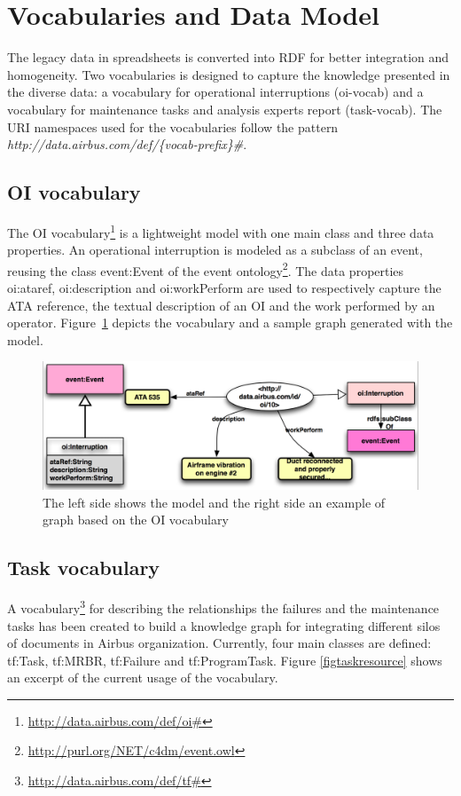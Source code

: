 \documentclass[runningheads,a4paper]{{llncs}}
\begin{document}
\section{Vocabularies and Data Model}
\label{sec:data-model}
The legacy data in spreadsheets is converted into RDF for better integration and homogeneity. Two vocabularies is designed to capture the knowledge presented in the diverse data: a vocabulary for operational interruptions (oi-vocab) and a vocabulary for maintenance tasks and analysis experts report (task-vocab). The URI namespaces used for the vocabularies follow the pattern \textit{http://data.airbus.com/def/\{vocab-prefix\}\#}. 

\subsection{OI vocabulary}
\label{oivocab}
The OI vocabulary\footnote{\url{http://data.airbus.com/def/oi#}} is a lightweight model with one main class and three data properties. An operational interruption is modeled as a subclass of an event, reusing the class \textsf{event:Event} of the event ontology\footnote{\url{http://purl.org/NET/c4dm/event.owl}}. The data properties \textsf{oi:ataref}, \textsf{oi:description} and \textsf{oi:workPerform} are used to respectively capture the ATA reference, the textual description of an OI and the work performed by an operator. Figure~\ref{figoi} depicts the vocabulary and a sample graph generated with the model. 

\begin{figure}[!htb]
\centering
\includegraphics[scale=0.45]{img/oi-graph-model.png}
\caption{The left side shows the model and the right side an example of graph based on the OI vocabulary }
\label{figoi}
\end{figure} 
 

\subsection{Task vocabulary}
\label{sec:mpd-vocab} 
A vocabulary\footnote{\url{http://data.airbus.com/def/tf#}} for describing the relationships the failures and the maintenance tasks has been created to build a knowledge graph for integrating different silos of documents in Airbus organization. Currently, four main classes are defined: \textsf{tf:Task}, \textsf{tf:MRBR}, \textsf{tf:Failure} and \textsf{tf:ProgramTask}. Figure \ref{figtaskresource} shows an excerpt of the current usage of the vocabulary.   
\end{document}
